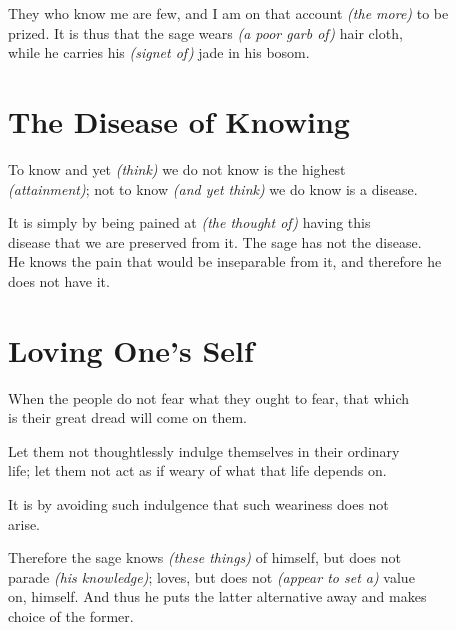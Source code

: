     They who know me are few, and I am on that account \textit{(the more)} to be\\
    prized. It is thus that the sage wears \textit{(a poor garb of)} hair cloth,\\
    while he carries his \textit{(signet of)} jade in his bosom.\vspace{\baselineskip}
    
\section*{The Disease of Knowing}
    To know and yet \textit{(think)} we do not know is the highest\\
    \textit{(attainment)}; not to know \textit{(and yet think)} we do know is a disease.\vspace{\baselineskip}
    
    It is simply by being pained at \textit{(the thought of)} having this\\
    disease that we are preserved from it. The sage has not the disease.\\
    He knows the pain that would be inseparable from it, and therefore he\\
    does not have it.\vspace{\baselineskip}
\section*{Loving One's Self}
    When the people do not fear what they ought to fear, that which\\
    is their great dread will come on them.\vspace{\baselineskip}
    
    Let them not thoughtlessly indulge themselves in their ordinary\\
    life; let them not act as if weary of what that life depends on.\vspace{\baselineskip}
    
    It is by avoiding such indulgence that such weariness does not\\
    arise.\vspace{\baselineskip}
    
    Therefore the sage knows \textit{(these things)} of himself, but does not\\
    parade \textit{(his knowledge)}; loves, but does not \textit{(appear to set a)} value\\
    on, himself. And thus he puts the latter alternative away and makes\\
    choice of the former.\vspace{\baselineskip}
\newpage{}
